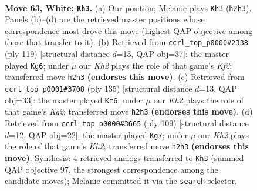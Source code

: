 \documentclass[11pt]{article}
\begin{document}
\clearpage

\begin{figure}[p]\centering
\begin{subfigure}{0.46\textwidth}\centering
\resizebox{\linewidth}{!}{%
\newchessgame
\chessboard[
  setfen={8/5kp1/3R1p2/N6p/3P3P/2r3P1/7K/8 w - - 19 63},
  showmover=false,
  pgfstyle=straightmove, color=movearrow, markmove={h2-h3}
]}
\caption{}
\end{subfigure}\hfill
\begin{subfigure}{0.46\textwidth}\centering
\resizebox{\linewidth}{!}{%
\newchessgame
\chessboard[
  setfen={8/5k2/4p3/2R3p1/4r1Pp/7P/5PK1/8 b - - 25 60},
  showmover=false,
  pgfstyle=straightmove, color=movearrow, markmove={f7-g6}
]}
\caption{}
\end{subfigure}
\\[4pt]
\begin{subfigure}{0.46\textwidth}\centering
\resizebox{\linewidth}{!}{%
\newchessgame
\chessboard[
  setfen={8/6k1/4p3/R5p1/4r1Pp/7P/5PK1/8 b - - 24 68},
  showmover=false,
  pgfstyle=straightmove, color=movearrow, markmove={g7-f6}
]}
\caption{}
\end{subfigure}\hfill
\begin{subfigure}{0.46\textwidth}\centering
\resizebox{\linewidth}{!}{%
\newchessgame
\chessboard[
  setfen={1R6/5p1k/7p/4P2P/5P2/5K2/1p5r/8 b - - 6 55},
  showmover=false,
  pgfstyle=straightmove, color=movearrow, markmove={h7-g7}
]}
\caption{}
\end{subfigure}
\caption{\textbf{Move 63, White: \texttt{Kh3}.} (a) Our position; Melanie plays \texttt{Kh3} (\texttt{h2h3}). Panels (b)--(d) are the retrieved master positions whose correspondence most drove this move (highest QAP objective among those that transfer to it). (b) Retrieved from \texttt{ccrl\_top\_p0000\#2338} (ply 119) [structural distance $d$=13, QAP obj=37]: the master played \texttt{Kg6}; under $\mu$ our \emph{Kh2} plays the role of that game's \emph{Kf2}; transferred move \texttt{h2h3} \textbf{(endorses this move)}. (c) Retrieved from \texttt{ccrl\_top\_p0001\#3708} (ply 135) [structural distance $d$=13, QAP obj=33]: the master played \texttt{Kf6}; under $\mu$ our \emph{Kh2} plays the role of that game's \emph{Kg2}; transferred move \texttt{h2h3} \textbf{(endorses this move)}. (d) Retrieved from \texttt{ccrl\_top\_p0000\#3665} (ply 109) [structural distance $d$=12, QAP obj=22]: the master played \texttt{Kg7}; under $\mu$ our \emph{Kh2} plays the role of that game's \emph{Kh2}; transferred move \texttt{h2h3} \textbf{(endorses this move)}. Synthesis: 4 retrieved analogs transferred to \texttt{Kh3} (summed QAP objective 97, the strongest correspondence among the candidate moves); Melanie committed it via the \texttt{search} selector.}
\label{fig:thought-m124}
\end{figure}
\end{document}
